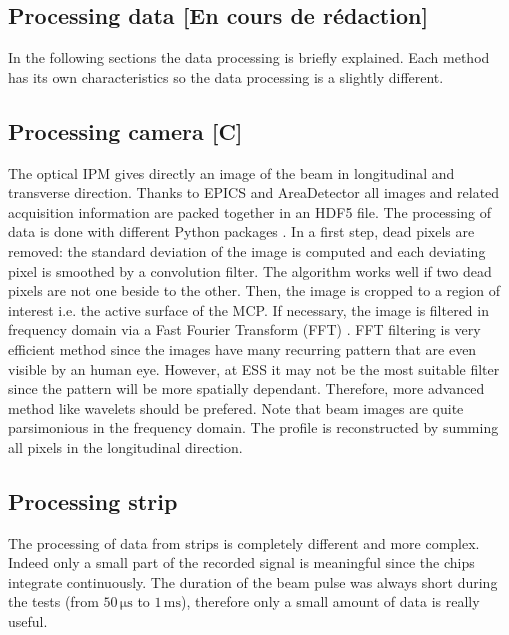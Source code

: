 \begin{refsection}
  


  \section{Processing data [En cours de rédaction]}
  In the following sections the data processing is briefly explained. Each method has its own characteristics so the data processing is a slightly different.

  \subsection{Processing camera [C]}
  The optical IPM gives directly an image of the beam in longitudinal and transverse direction. Thanks to EPICS and AreaDetector all images and related acquisition information are packed together in an HDF5 file. The processing of data is done with different Python packages \cite{NumPy2011,SciPy2019,Hunter2007}. In a first step, dead pixels are removed: the standard deviation of the image is computed and each deviating pixel is smoothed by a convolution filter. The algorithm works well if two dead pixels are not one beside to the other. Then, the image is cropped to a region of interest i.e. the active surface of the MCP.  If necessary, the image is filtered in frequency domain via a Fast Fourier Transform (FFT) \cite{Burrus2012}. FFT filtering is very efficient method since the images have many recurring pattern that are even visible by an human eye. However, at ESS it may not be the most suitable filter since the pattern will be more spatially dependant. Therefore, more advanced method like wavelets \cite{Burrus1997,bultheel2014} should be prefered. Note that beam images are quite parsimonious in the frequency domain. The profile is reconstructed by summing all pixels in the longitudinal direction.

  

  \subsection{Processing strip}
  The processing of data from strips is completely different and more complex. Indeed only a small part of the recorded signal is meaningful since the chips integrate continuously. The duration of the beam pulse was always short during the tests (from $50\,\mathrm{\mu s}$ to $1\,\mathrm{ms}$), therefore only a small amount of data is really useful.


\end{refsection}
